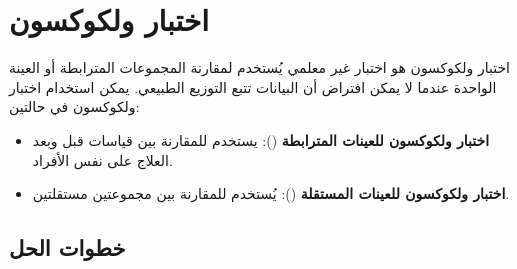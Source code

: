 \section{اختبار ولكوكسون }

اختبار ولكوكسون هو اختبار غير معلمي يُستخدم لمقارنة المجموعات المترابطة أو العينة الواحدة عندما لا يمكن افتراض أن البيانات تتبع التوزيع الطبيعي. يمكن استخدام اختبار ولكوكسون في حالتين:

\begin{itemize}
	\item \textbf{اختبار ولكوكسون للعينات المترابطة} (): يستخدم للمقارنة بين قياسات قبل وبعد العلاج على نفس الأفراد.
	\item \textbf{اختبار ولكوكسون للعينات المستقلة} (): يُستخدم للمقارنة بين مجموعتين مستقلتين.
\end{itemize}

\subsection*{خطوات الحل}

